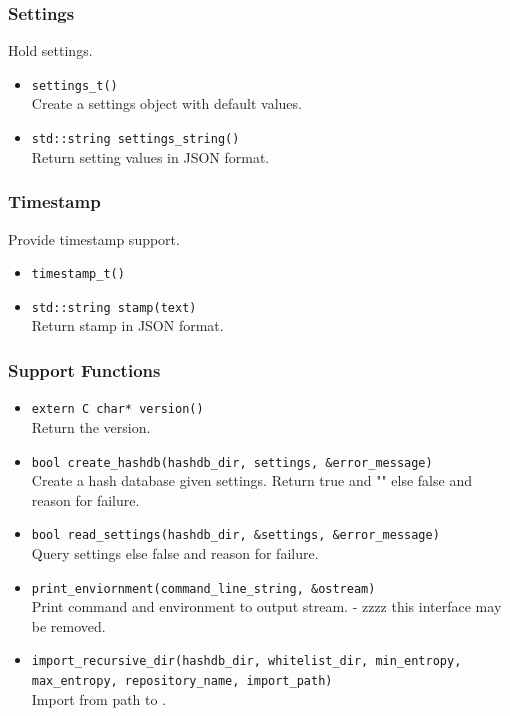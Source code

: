 \documentclass[11pt,fleqn]{article} %
\begin{document}
\subsubsection{Settings}
Hold \hdb settings.

\begin{itemize}
\item \verb+settings_t()+\\
Create a settings object with default values.
\item \verb+std::string settings_string()+\\
Return setting values in JSON format.
\end{itemize}

\subsubsection{Timestamp}
Provide timestamp support.

\begin{itemize}
\item \verb+timestamp_t()+
\item \verb+std::string stamp(text)+\\
Return stamp in JSON format.
\end{itemize}

\subsubsection{Support Functions}

\begin{itemize}
\item \verb+extern C char* version()+\\
Return the \hdb version.
\item \verb+bool create_hashdb(hashdb_dir, settings, &error_message)+\\
Create a hash database given settings. Return true and "" else false and reason for failure.
\item \verb+bool read_settings(hashdb_dir, &settings, &error_message)+\\
Query settings else false and reason for failure.
\item \verb+print_enviornment(command_line_string, &ostream)+\\
Print command and environment to output stream. - zzzz this interface may be removed.
\item \verb+import_recursive_dir(hashdb_dir, whitelist_dir, min_entropy,+\\
\verb+max_entropy, repository_name, import_path)+\\
Import from path to \hdb.
\end{itemize}
\end{document}
